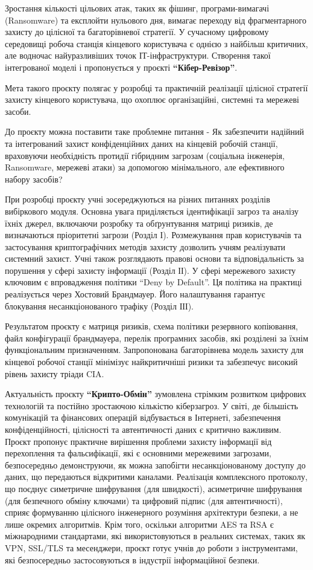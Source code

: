 Зростання кількості цільових атак, таких як фішинг, програми-вимагачі (Ransomware) та експлойти нульового дня, вимагає переходу від фрагментарного захисту до цілісної та багаторівневої стратегії. У сучасному цифровому середовищі робоча станція кінцевого користувача є однією з найбільш критичних, але водночас найуразливіших точок ІТ-інфраструктури. Створення такої інтегрованої моделі і пропонується у проєкті \textbf{``Кібер-Ревізор''}.

Мета такого проєкту полягає у розробці та практичній реалізації цілісної стратегії захисту кінцевого користувача, що охоплює організаційні, системні та мережеві засоби. 

До проєкту можна поставити таке проблемне питання - Як забезпечити надійний та інтегрований захист конфіденційних даних на кінцевій робочій станції, враховуючи необхідність протидії гібридним загрозам (соціальна інженерія, Ransomware, мережеві атаки) за допомогою мінімального, але ефективного набору засобів?

При розробці проєкту учні зосереджуються на різних питаннях розділів вибіркового модуля. Основна увага приділяється ідентифікації загроз та аналізу їхніх джерел, включаючи розробку та обґрунтування матриці ризиків, де визначаються пріоритетні загрози (Розділ І). Розмежування прав користувачів та   застосування криптографічних методів захисту дозволить учням реалізувати системний захист. Учні також розглядають правові основи та відповідальність за порушення у сфері захисту інформації (Розділ ІІ). У сфері мережевого захисту ключовим є впровадження політики ``Deny by Default''. Ця політика на практиці реалізується через Хостовий Брандмауер. Його налаштування гарантує блокування несанкціонованого трафіку (Розділ ІІІ).

Результатом проєкту є матриця ризиків, схема політики резервного копіювання, файл конфігурації брандмауера, перелік програмних засобів, які розділені за їхнім функціональним призначенням. Запропонована багаторівнева модель захисту для кінцевої робочої станції мінімізує найкритичніші ризики та забезпечує високий рівень захисту тріади CIA.

Актуальність проєкту \textbf{``Крипто-Обмін''} зумовлена стрімким розвитком цифрових технологій та постійно зростаючою кількістю кіберзагроз. У світі, де більшість комунікацій та фінансових операцій відбувається в Інтернеті, забезпечення конфіденційності, цілісності та автентичності даних є критично важливим. Проєкт пропонує практичне вирішення проблеми захисту інформації від перехоплення та фальсифікації, які є основними мережевими загрозами, безпосередньо демонструючи, як можна запобігти несанкціонованому доступу до даних, що передаються відкритими каналами. Реалізація комплексного протоколу, що поєднує симетричне шифрування (для швидкості), асиметричне шифрування (для безпечного обміну ключами) та цифровий підпис (для автентичності), сприяє формуванню цілісного інженерного розуміння архітектури безпеки, а не лише окремих алгоритмів. Крім того, оскільки алгоритми AES та RSA є міжнародними стандартами, які використовуються в реальних системах, таких як VPN, SSL/TLS та месенджери, проєкт готує учнів до роботи з інструментами, які безпосередньо застосовуються в індустрії інформаційної безпеки.

